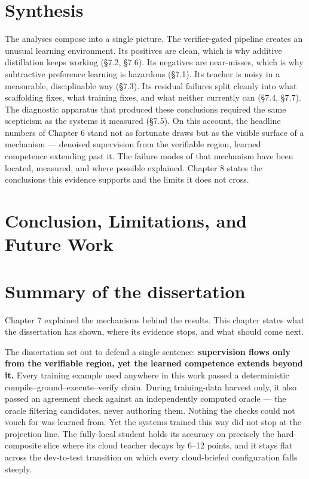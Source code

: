 \documentclass[10pt]{article} %
\begin{document}
\section{Synthesis}\label{sec:synthesis}

The analyses compose into a single picture. The verifier-gated pipeline creates an unusual learning environment. Its positives are clean, which is why additive distillation keeps working (\S7.2, \S7.6). Its negatives are near-misses, which is why subtractive preference learning is hazardous (\S7.1). Its teacher is noisy in a measurable, disciplinable way (\S7.3). Its residual failures split cleanly into what scaffolding fixes, what training fixes, and what neither currently can (\S7.4, \S7.7). The diagnostic apparatus that produced these conclusions required the same scepticism as the systems it measured (\S7.5). On this account, the headline numbers of Chapter 6 stand not as fortunate draws but as the visible surface of a mechanism --- denoised supervision from the verifiable region, learned competence extending past it. The failure modes of that mechanism have been located, measured, and where possible explained. Chapter 8 states the conclusions this evidence supports and the limits it does not cross.

\section{Conclusion, Limitations, and Future Work}\label{sec:chapter-8-conclusion-limitations-and-fut}

\section{Summary of the dissertation}\label{sec:summary-of-the-dissertation}

Chapter 7 explained the mechanisms behind the results. This chapter states what the dissertation has shown, where its evidence stops, and what should come next.

The dissertation set out to defend a single sentence: \textbf{supervision flows only from the verifiable region, yet the learned competence extends beyond it.} Every training example used anywhere in this work passed a deterministic compile--ground--execute--verify chain. During training-data harvest only, it also passed an agreement check against an independently computed oracle --- the oracle filtering candidates, never authoring them. Nothing the checks could not vouch for was learned from. Yet the systems trained this way did not stop at the projection line. The fully-local student holds its accuracy on precisely the hard-composite slice where its cloud teacher decays by 6--12 points, and it stays flat across the dev-to-test transition on which every cloud-briefed configuration falls steeply.
\end{document}
